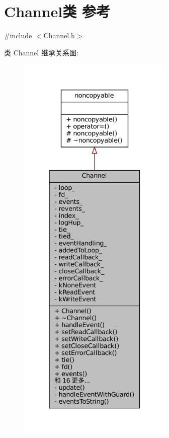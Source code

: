 \hypertarget{classmuduo_1_1net_1_1Channel}{}\section{Channel类 参考}
\label{classmuduo_1_1net_1_1Channel}


{\ttfamily \#include $<$Channel.\+h$>$}



类 Channel 继承关系图\+:
\nopagebreak
\begin{figure}[H]
\begin{center}
\leavevmode
\includegraphics[height=550pt]{classmuduo_1_1net_1_1Channel__inherit__graph}
\end{center}
\end{figure}


